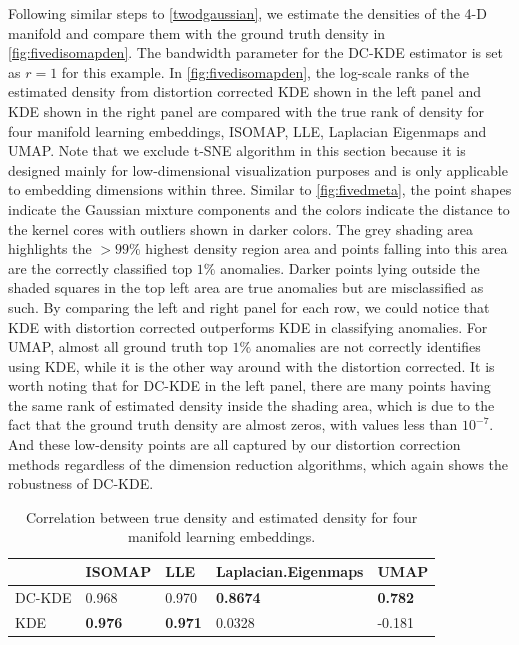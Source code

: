 \documentclass[11pt,a4paper,]{article}
\begin{document}
Following similar steps to \autoref{twodgaussian}, we estimate the densities of the 4-D manifold and compare them with the ground truth density in \autoref{fig:fivedisomapden}. The bandwidth parameter for the DC-KDE estimator is set as \(r=1\) for this example. In \autoref{fig:fivedisomapden}, the log-scale ranks of the estimated density from distortion corrected KDE shown in the left panel and KDE shown in the right panel are compared with the true rank of density for four manifold learning embeddings, ISOMAP, LLE, Laplacian Eigenmaps and UMAP. Note that we exclude t-SNE algorithm in this section because it is designed mainly for low-dimensional visualization purposes and is only applicable to embedding dimensions within three.
Similar to \autoref{fig:fivedmeta}, the point shapes indicate the Gaussian mixture components and the colors indicate the distance to the kernel cores with outliers shown in darker colors. The grey shading area highlights the \(>99\%\) highest density region area and points falling into this area are the correctly classified top \(1\%\) anomalies. Darker points lying outside the shaded squares in the top left area are true anomalies but are misclassified as such. By comparing the left and right panel for each row, we could notice that KDE with distortion corrected outperforms KDE in classifying anomalies. For UMAP, almost all ground truth top \(1\%\) anomalies are not correctly identifies using KDE, while it is the other way around with the distortion corrected. It is worth noting that for DC-KDE in the left panel, there are many points having the same rank of estimated density inside the shading area, which is due to the fact that the ground truth density are almost zeros, with values less than \(10^{-7}\). And these low-density points are all captured by our distortion correction methods regardless of the dimension reduction algorithms, which again shows the robustness of DC-KDE.

\begin{table}

\caption{\label{tab:fivedcors}Correlation between true density and estimated density for four manifold learning embeddings.}
\centering
\begin{tabular}[t]{l>{}l>{}l>{}l>{}l}
\toprule
  & ISOMAP & LLE & Laplacian.Eigenmaps & UMAP\\
\midrule
DC-KDE & 0.968 & 0.970 & \textbf{0.8674} & \textbf{0.782}\\
KDE & \textbf{0.976} & \textbf{0.971} & 0.0328 & -0.181\\
\bottomrule
\end{tabular}
\end{table}
\end{document}
